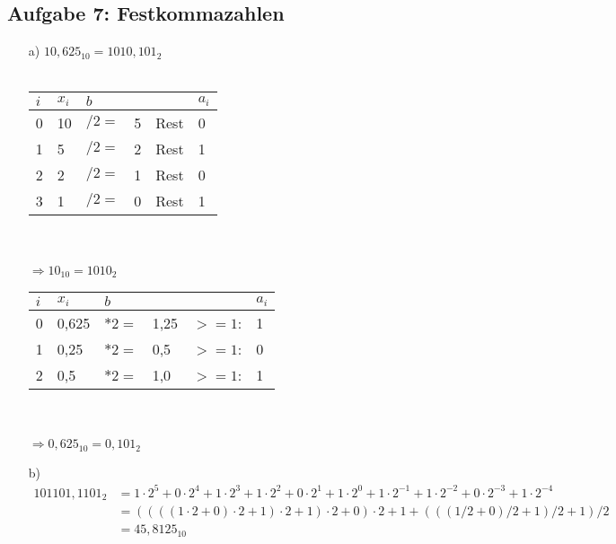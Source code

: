 \documentclass{article}
\begin{document}
    \subsection*{Aufgabe 7: Festkommazahlen}
    \begin{enumerate}
        \item[a)] $10,625_{10} = 1010,101_2$\\\\
        \begin{minipage}[t]{0.35\textwidth}
            \begin{tabular}[t]{llllll}
                $i$ & $x_i$ & $b$     &       &       & $a_i$ \\
                \hline 
                0   & 10    & $/2 = $ & 5     & Rest  & 0 \\
                1   & 5     & $/2 = $ & 2     & Rest  & 1 \\
                2   & 2     & $/2 = $ & 1     & Rest  & 0 \\
                3   & 1     & $/2 = $ & 0     & Rest  & 1 \\
            \end{tabular}\\\\
            $\Rightarrow 10_{10} = 1010_2$
        \end{minipage} 
        \begin{minipage}[t]{0.35\textwidth}
            \begin{tabular}[t]{llllll}
                $i$ & $x_i$ & $b$     &       &       & $a_i$ \\
                \hline 
                0   & 0,625 & $*2 = $ & 1,25   & $>=1$: & 1 \\
                1   & 0,25  & $*2 = $ & 0,5    & $>=1$: & 0 \\
                2   & 0,5   & $*2 = $ & 1,0    & $>=1$: & 1
            \end{tabular}\\\\
            $\Rightarrow 0,625_{10} = 0,101_2$
        \end{minipage} 
        \item[b)] 
        \begin{align*}
            101101,1101_2 &= 1\cdot 2^5 + 0 \cdot 2^4 + 1\cdot 2^3 + 1\cdot 2^2 + 0\cdot 2^1 + 1\cdot 2^0 + 1\cdot 2^{-1} + 1\cdot 2^{-2} + 0\cdot 2^{-3}+1\cdot 2^{-4}\\
            &= ((((1 \cdot 2 + 0) \cdot 2 + 1) \cdot 2 + 1) \cdot 2 + 0) \cdot 2 + 1 + (((1 / 2 + 0) / 2 + 1) / 2 + 1) / 2\\
            &= 45,8125_{10}
        \end{align*}
    \end{enumerate}
\end{document}
